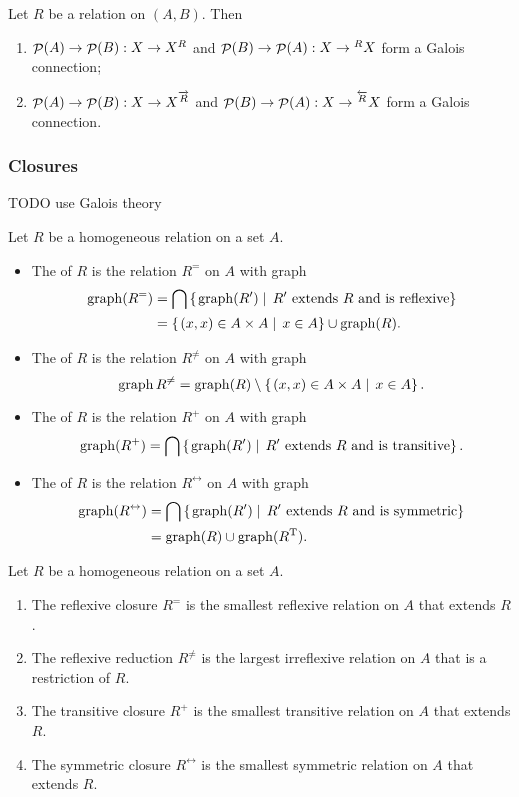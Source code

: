 \begin{proposition}
Let $R$ be a relation on $(A,B)$. Then
\begin{enumerate}
\item $\mathop{\mathcal{P}}(A)\to \mathop{\mathcal{P}}(B): X\to X^R$ and $\mathop{\mathcal{P}}(B)\to \mathop{\mathcal{P}}(A): X\to {^RX}$ form a Galois connection;
\item $\mathop{\mathcal{P}}(A)\to \mathop{\mathcal{P}}(B): X\to X^{\overrightarrow{R}}$ and $\mathop{\mathcal{P}}(B)\to \mathop{\mathcal{P}}(A): X\to {^{\overleftarrow{R}}X}$ form a Galois connection.
\end{enumerate}
\end{proposition}

\subsubsection{Closures}
TODO use Galois theory
\begin{definition}
Let $R$ be a homogeneous relation on a set $A$.
\begin{itemize}
\item The  of $R$ is the relation $R^=$ on $A$ with graph
\begin{align*}
\operatorname{graph}(R^=) &= \bigcap\left\{\left. \operatorname{graph}(R') \;\right|\; \text{$R'$ extends $R$ and is reflexive} \right\} \\
&= \left\{\left. (x,x)\in A\times A \;\right|\; x\in A \right\}\cup \operatorname{graph}(R).
\end{align*}
\item The  of $R$ is the relation $R^{\neq}$ on $A$ with graph
\[ \operatorname{graph}{R^{\neq}} = \operatorname{graph}(R)\setminus \left\{\left. (x,x)\in A\times A \;\right|\; x \in A \right\}. \]
\item The  of $R$ is the relation $R^{+}$ on $A$ with graph
\[ \operatorname{graph}(R^+) = \bigcap\left\{\left. \operatorname{graph}(R') \;\right|\; \text{$R'$ extends $R$ and is transitive} \right\}. \]
\item The  of $R$ is the relation $R^{\leftrightarrow}$ on $A$ with graph
\begin{align*}
\operatorname{graph}(R^\leftrightarrow) &= \bigcap\left\{\left. \operatorname{graph}(R') \;\right|\; \text{$R'$ extends $R$ and is symmetric} \right\} \\
&=  \operatorname{graph}(R)\cup \operatorname{graph}(R^{\mathrm{T}}).
\end{align*}
\end{itemize}
\end{definition}

\begin{lemma}
Let $R$ be a homogeneous relation on a set $A$.
\begin{enumerate}
\item The reflexive closure $R^=$ is the smallest reflexive relation on $A$ that extends $R$.
\item The reflexive reduction $R^{\neq}$ is the largest irreflexive relation on $A$ that is a restriction of $R$.
\item The transitive closure $R^{+}$ is the smallest transitive relation on $A$ that extends $R$.
\item The symmetric closure $R^{\leftrightarrow}$ is the smallest symmetric relation on $A$ that extends $R$.
\end{enumerate}
\end{lemma}

